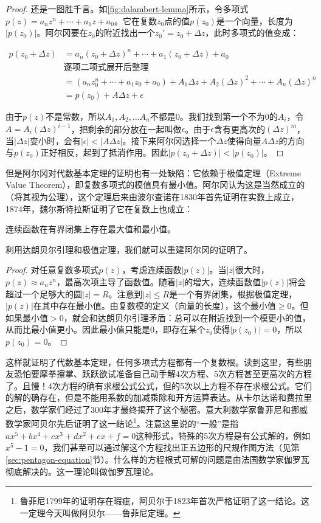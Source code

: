 \documentclass[b5paper]{ctexart}
\begin{document}
\begin{proof}
还是一图胜千言。如\cref{fig:dalambert-lemma}所示，令多项式$p(z) = a_nz^n + \dotsb + a_1z + a_0$。它在复数$z_0$点的值$p(z_0)$是一个向量，长度为$|p(z_0)|$。阿尔冈要在$z_0$的附近找出一个$z_0' = z_0 + \Delta z$，此时多项式的值变成：

\begin{align*}
p(z_0 + \Delta z) &= a_n (z_0 + \Delta z)^n + \dotsb + a_1 (z_0 + \Delta z) + a_0  \\
 & \text{逐项二项式展开后整理} \\
 &= (a_n z_0^n + \dotsb + a_1 z_0 + a_0) + A_1 \Delta z + A_2 (\Delta z)^2 + \dotsb + A_n (\Delta z)^n \\
 &= p(z_0) + A \Delta z + \epsilon
\end{align*}

由于$p(z)$不是常数，所以$A_1, A_2, \dots A_n$不都是0。我们找到第一个不为0的$A_i$，令$A = A_i (\Delta z)^{i - 1}$，把剩余的部分放在一起叫做$\epsilon$。由于$\epsilon$含有更高次的$(\Delta z)^m$，当$|\Delta z|$变小时，会有$|\epsilon| < |A \Delta z|$。接下来阿尔冈选择一个$\Delta z$使得向量$A \Delta z$的方向与$p(z_0)$正好相反，起到了抵消作用。因此$|p(z_0 + \Delta z)| < |p(z_0)|$。
\end{proof}

但是阿尔冈对代数基本定理的证明也有一处缺陷：它依赖于极值定理（Extreme Value Theorem），即复数多项式的模值具有最小值。阿尔冈认为这是当然成立的（将其视为公理），这个定理后来由波尔查诺在1830年首先证明在实数上成立，1874年，魏尔斯特拉斯证明了它在复数上也成立：

\begin{theorem}[极值定理]
连续函数在有界闭集上存在最大值和最小值。
\end{theorem}

利用达朗贝尔引理和极值定理，我们就可以重建阿尔冈的证明了。

\begin{proof}
对任意复数多项式$p(z)$，考虑连续函数$|p(z)|$。当$|z|$很大时，$p(z) \approx a_n z^n$，最高次项主导了函数值。随着$|z|$的增大，连续函数值$|p(z)|$将会超过一个足够大的圆$|z| = R$。注意到$|z| \leq R$是一个有界闭集，根据极值定理，$|p(z)|$在其中存在最小值。由复数模的定义（向量的长度），这个最小值$\geq 0$。但如果最小值$> 0$，就会和达朗贝尔引理矛盾：总可以在附近找到一个模更小的值，从而比最小值更小。因此最小值只能是0，即存在某个$z_0$使得$|p(z_0)| = 0$，所以$p(z_0) = 0$。
\end{proof}

这样就证明了代数基本定理，任何多项式方程都有一个复数根。读到这里，有些朋友恐怕要摩拳擦掌、跃跃欲试准备自己动手解4次方程、5次方程甚至更高次的方程了。且慢！4次方程的确有求根公式公式，但的5次以上方程不存在求根公式。它们的解的确存在，但是不能用系数的加减乘除和开方运算表达。从卡尔达诺和费拉里之后，数学家们经过了300年才最终揭开了这个秘密。意大利数学家鲁菲尼和挪威数学家阿贝尔先后证明了这一结论\footnote{鲁菲尼1799年的证明存在瑕疵，阿贝尔于1823年首次严格证明了这一结论。这一定理今天叫做阿贝尔——鲁菲尼定理。}。注意这里说的“一般”是指$ax^5 + bx^4 + cx^3 + dx^2 + ex + f = 0$这种形式，特殊的5次方程是有公式解的，例如$x^5 - 1 = 0$，我们甚至可以通过解这个方程找出正五边形的尺规作图方法（见第\ref{sec:pentagon-equation}节）。什么样的方程根式可解的问题是由法国数学家伽罗瓦彻底解决的。这一理论叫做伽罗瓦理论。
\end{document}
